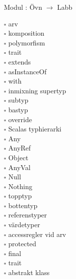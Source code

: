 
    Modul : Övn  $\rightarrow$ Labb 
    \begin{multicols}{3}\SlideFontTiny
    $\square$ arv \\
$\square$ komposition \\
$\square$ polymorfism \\
$\square$ trait \\
$\square$ extends \\
$\square$ asInstanceOf \\
$\square$ with \\
$\square$ inmixning supertyp \\
$\square$ subtyp \\
$\square$ bastyp \\
$\square$ override \\
$\square$ Scalas typhierarki \\
$\square$ Any \\
$\square$ AnyRef \\
$\square$ Object \\
$\square$ AnyVal \\
$\square$ Null \\
$\square$ Nothing \\
$\square$ topptyp \\
$\square$ bottentyp \\
$\square$ referenstyper \\
$\square$ värdetyper \\
$\square$ accessregler vid arv \\
$\square$ protected \\
$\square$ final \\
$\square$ trait \\
$\square$ abstrakt klass \\
    \end{multicols}
    